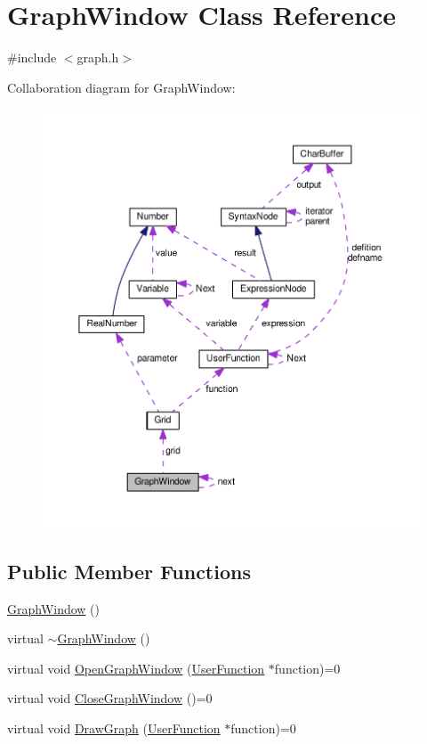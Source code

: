 \hypertarget{classGraphWindow}{}\section{Graph\+Window Class Reference}
\label{classGraphWindow}


{\ttfamily \#include $<$graph.\+h$>$}



Collaboration diagram for Graph\+Window\+:
\nopagebreak
\begin{figure}[H]
\begin{center}
\leavevmode
\includegraphics[width=350pt]{da/d59/classGraphWindow__coll__graph}
\end{center}
\end{figure}
\subsection*{Public Member Functions}
\begin{DoxyCompactItemize}
\item 
\hyperlink{classGraphWindow_ab8ca84cf6fe5a68e7fb87b7f47636d7d}{Graph\+Window} ()
\item 
virtual \hyperlink{classGraphWindow_acca1dc8c3eefe6608ae2de3cee2e22ee}{$\sim$\+Graph\+Window} ()
\item 
virtual void \hyperlink{classGraphWindow_a63309cbe3e1989d9eac566372dc888e8}{Open\+Graph\+Window} (\hyperlink{classUserFunction}{User\+Function} $\ast$function)=0
\item 
virtual void \hyperlink{classGraphWindow_a8d4db6854a2eb91d5e04fdc91918b56b}{Close\+Graph\+Window} ()=0
\item 
virtual void \hyperlink{classGraphWindow_a476a4a268feb290df84b6dc4eeac8af2}{Draw\+Graph} (\hyperlink{classUserFunction}{User\+Function} $\ast$function)=0
\end{DoxyCompactItemize}
